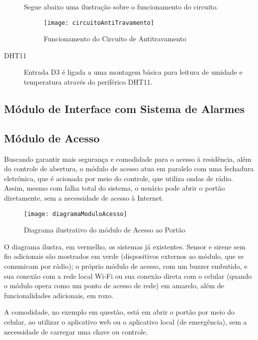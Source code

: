 \begin{description}
Segue abaixo uma ilustração sobre o funcionamento do circuito.

\begin{figure}[H]
	\centering
	\caption{Funcionamento do Circuito de Antitravamento}
  \texttt{[image: circuitoAntiTravamento]}
\label{fig:circuitoAntiTravamento}
\end{figure}

\item [DHT11] Entrada D3 é ligada a uma montagem básica para leitura de umidade e temperatura através do periférico DHT11.

\end{description}

\subsection{Módulo de Interface com Sistema de Alarmes}

\subsection{Módulo de Acesso}

Buscando garantir mais segurança e comodidade para o acesso à residência, além do controle de abertura, o módulo de acesso atua em paralelo com uma fechadura eletrônica, que é acionada por meio do controle, que utiliza ondas de rádio. Assim, mesmo com falha total do sistema, o usuário pode abrir o portão diretamente, sem a necessidade de acesso à Internet.

\begin{figure}[H]
	\centering
	\caption{Diagrama ilustrativo do módulo de Acesso ao Portão}
  \texttt{[image: diagramaModuloAcesso]}
\label{fig:diagramaModuloAcesso}
\end{figure}

O diagrama ilustra, em vermelho, os sistemas já existentes. Sensor e sirene sem fio adicionais são mostrados em verde (dispositivos externos ao módulo, que se comunicam por rádio); o próprio módulo de acesso, com um buzzer embutido, e sua conexão com a rede local Wi-Fi ou sua conexão direta com o celular (quando o módulo opera como um ponto de acesso de rede) em amarelo, além de funcionalidades adicionais, em roxo.

A comodidade, no exemplo em questão, está em abrir o portão por meio do celular, ao utilizar o aplicativo web ou o aplicativo local (de emergência), sem a necessidade de carregar uma chave ou controle.

